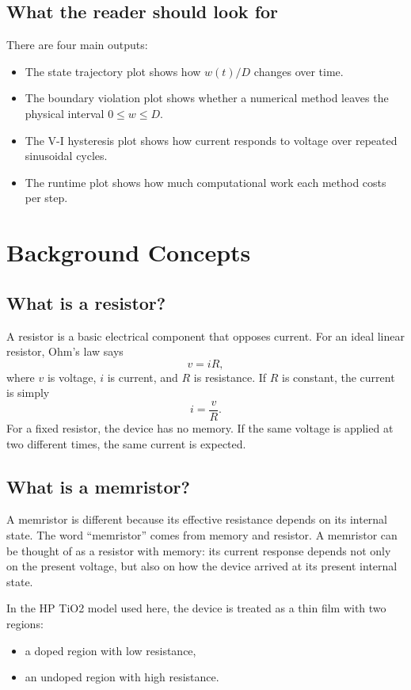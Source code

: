 \documentclass[11pt]{article}
\begin{document}
\subsection{What the reader should look for}

There are four main outputs:
\begin{itemize}[noitemsep]
  \item The state trajectory plot shows how \(w(t)/D\) changes over time.
  \item The boundary violation plot shows whether a numerical method leaves the physical interval \(0 \leq w \leq D\).
  \item The V-I hysteresis plot shows how current responds to voltage over repeated sinusoidal cycles.
  \item The runtime plot shows how much computational work each method costs per step.
\end{itemize}

\section{Background Concepts}

\subsection{What is a resistor?}

A resistor is a basic electrical component that opposes current. For an ideal linear resistor, Ohm's law says
\[
v = iR,
\]
where \(v\) is voltage, \(i\) is current, and \(R\) is resistance. If \(R\) is constant, the current is simply
\[
i = \frac{v}{R}.
\]
For a fixed resistor, the device has no memory. If the same voltage is applied at two different times, the same current is expected.

\subsection{What is a memristor?}

A memristor is different because its effective resistance depends on its internal state. The word ``memristor'' comes from memory and resistor. A memristor can be thought of as a resistor with memory: its current response depends not only on the present voltage, but also on how the device arrived at its present internal state.

In the HP TiO2 model used here, the device is treated as a thin film with two regions:
\begin{itemize}[noitemsep]
  \item a doped region with low resistance,
  \item an undoped region with high resistance.
\end{itemize}
\end{document}
